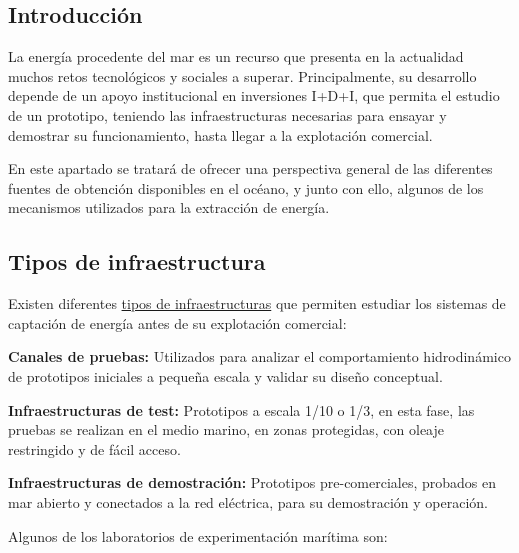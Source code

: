 \subsection{Introducción}\label{header-n3}

La energía procedente del mar es un recurso que presenta en la
actualidad muchos retos tecnológicos y sociales a superar.
Principalmente, su desarrollo depende de un apoyo institucional en
inversiones I+D+I, que permita el estudio de un prototipo, teniendo las
infraestructuras necesarias para ensayar y demostrar su funcionamiento,
hasta llegar a la explotación comercial.

En este apartado se tratará de ofrecer una perspectiva general de las
diferentes fuentes de obtención disponibles en el océano, y junto con
ello, algunos de los mecanismos utilizados para la extracción de
energía.

\subsection{Tipos de infraestructura}\label{header-n8}

Existen diferentes
\href{http://www.udc.es/iuem/documentos/doc_xornadas/anaeco/APROVEITAMENTODAENERXIADASOLAS.pdf}{tipos
de infraestructuras} que permiten estudiar los sistemas de captación de
energía antes de su explotación comercial:

\textbf{Canales de pruebas:} Utilizados para analizar el comportamiento
hidrodinámico de prototipos iniciales a pequeña escala y validar su
diseño conceptual.

\textbf{Infraestructuras de test:} Prototipos a escala 1/10 o 1/3, en
esta fase, las pruebas se realizan en el medio marino, en zonas
protegidas, con oleaje restringido y de fácil acceso.

\textbf{Infraestructuras de demostración:} Prototipos pre-comerciales,
probados en mar abierto y conectados a la red eléctrica, para su
demostración y operación.

Algunos de los laboratorios de experimentación marítima son:

